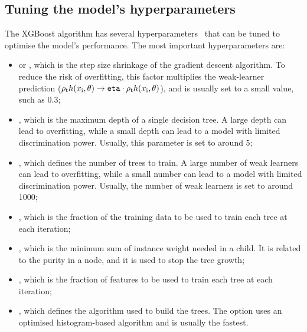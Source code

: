\subsection{Tuning the model's hyperparameters}
The XGBoost algorithm has several hyperparameters~\cite{XGBoost_parameters} that can be tuned to optimise the model's performance. The most important hyperparameters are:
\begin{itemize}
    \item {} or , which is the step size shrinkage of the gradient descent algorithm. To reduce the risk of overfitting, this factor multiplies the weak-learner prediction ($\rho_\mathrm{t} h(x_\mathrm{i},\theta) \rightarrow \texttt{eta} \cdot \rho_\mathrm{t} h(x_\mathrm{i},\theta)$), and is usually set to a small value, such as 0.3;
    \item {}, which is the maximum depth of a single decision tree. A large depth can lead to overfitting, while a small depth can lead to a model with limited discrimination power. Usually, this parameter is set to around 5;
    \item {}, which defines the number of trees to train. A large number of weak learners can lead to overfitting, while a small number can lead to a model with limited discrimination power. Usually, the number of weak learners is set to around 1000;
    \item {}, which is the fraction of the training data to be used to train each tree at each iteration;
    \item {}, which is the minimum sum of instance weight needed in a child. It is related to the purity in a node, and it is used to stop the tree growth;
    \item {}, which is the fraction of features to be used to train each tree at each iteration;
    \item {}, which defines the algorithm used to build the trees. The  option uses an optimised histogram-based algorithm and is usually the fastest.
\end{itemize}

